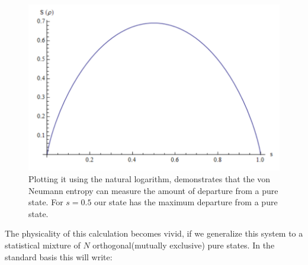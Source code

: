 \begin{itemize}
\begin{figure}
\begin{center}
\includegraphics[scale=0.8]{figures/von_ent_plot.png}
\caption{Plotting it using the natural logarithm, demonstrates that the von Neumann entropy can measure the amount of departure from a pure state. For $s=0.5$ our state has the maximum departure from a pure state.}
\label{figure1}
\end{center}
\end{figure}

The physicality of this calculation becomes vivid, if we generalize this system to a statistical mixture of $N$ orthogonal(mutually exclusive) pure states. In the standard basis this will write:


\end{itemize}
